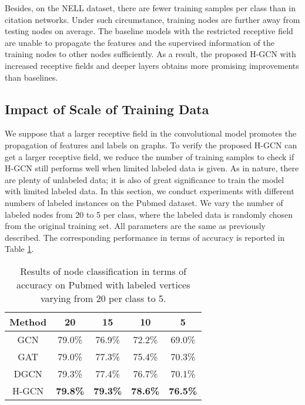 \documentclass{article}
\begin{document}
Besides, on the NELL dataset, there are fewer training samples per class than in citation networks. Under such circumstance, training nodes are further away from testing nodes on average. The baseline models with the restricted receptive field are unable to propagate the features and the supervised information of the training nodes to other nodes sufficiently. As a result, the proposed H-GCN with increased receptive fields and deeper layers obtains more promising improvements than baselines.

\subsection{Impact of Scale of Training Data}

We suppose that a larger receptive field in the convolutional model promotes the propagation of features and labels on graphs. To verify the proposed H-GCN can get a larger receptive field, we reduce the number of training samples to check if H-GCN still performs well when limited labeled data is given. As in nature, there are plenty of unlabeled data; it is also of great significance to train the model with limited labeled data. In this section, we conduct experiments with different numbers of labeled instances on the Pubmed dataset. We vary the number of labeled nodes from 20 to 5 per class, where the labeled data is randomly chosen from the original training set. All parameters are the same as previously described. The corresponding performance in terms of accuracy is reported in Table \ref{tab:labeled-data}.

\begin{table}
	\centering
	\small
    \begin{tabular}{ccccc}
		\toprule
		Method & 20    & 15    & 10    & 5 \\ \midrule
		GCN   & 79.0\% & 76.9\% & 72.2\% & 69.0\% \\
		GAT   & 79.0\% & 77.3\% & 75.4\% & 70.3\% \\
		DGCN  & 79.3\% & 77.4\% & 76.7\% & 70.1\% \\
		H-GCN & {\bf 79.8\%} & {\bf 79.3\%} & {\bf 78.6\%} & {\bf 76.5\%} \\
    	\bottomrule
    \end{tabular}
	\caption{Results of node classification in terms of accuracy on Pubmed with labeled vertices varying from 20 per class to 5.}
	\label{tab:labeled-data}
\end{table}
\end{document}
